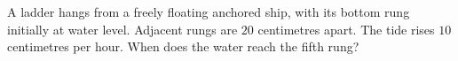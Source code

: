A ladder hangs from a freely floating anchored ship, with its bottom rung initially at water level. Adjacent rungs are $ 20 $ centimetres apart. The tide rises $ 10 $ centimetres per hour. When does the water reach the fifth rung?
